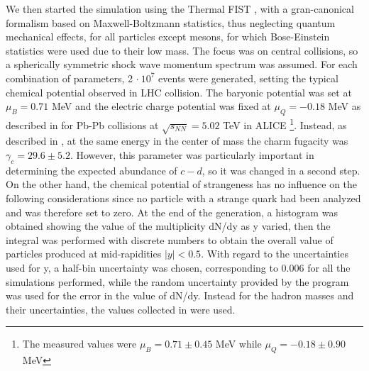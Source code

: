 \documentclass[12pt,a4paper]{book}
\begin{document}
	We then started the simulation using the Thermal FIST \cite{Vovchenko_2019}, with a gran-canonical formalism based on Maxwell-Boltzmann statistics, thus neglecting quantum mechanical effects, for all particles except mesons, for which Bose-Einstein statistics were used due to their low mass. The focus was on central collisions, so a spherically symmetric shock wave momentum spectrum was assumed. For each combination of parameters, 2 $\cdot \ 10^7$ events were generated, setting the typical chemical potential observed in LHC collision. The baryonic potential was set at $\mu_B=0.71$ MeV and the electric charge potential was fixed at $\mu_Q= -0.18$ MeV as described in \cite{Acharya_2024} for Pb-Pb collisions at $\sqrt{s_{NN}}= 5.02$ TeV in ALICE \footnote{The measured values were $\mu_B=0.71 \pm 0.45$ MeV while $\mu_Q=-0.18 \pm 0.90$ MeV}. Instead, as described in \cite{charm_hierarchy_in_the_statistical_hadronization_model}, at the same energy in the center of mass the charm fugacity was $\gamma_c = 29.6 \pm 5.2$. However, this parameter was particularly important in determining the expected abundance of $c-d$, so it was changed in a second step. On the other hand, the chemical potential of strangeness has no influence on the following considerations since no particle with a strange quark had been analyzed and was therefore set to zero.  At the end of the generation, a histogram was obtained showing the value of the multiplicity dN/dy as y varied, then the integral was performed with discrete numbers to obtain the overall value of particles produced at mid-rapidities $|y|<0.5$. With regard to the uncertainties used for y, a half-bin uncertainty was chosen, corresponding to 0.006 for all the simulations performed, while the random uncertainty provided by the program was used for the error in the value of dN/dy. Instead for the hadron masses and their uncertainties, the values collected in \cite{ParticleDataGroup:2024cfk} were used. 
	
\end{document}
